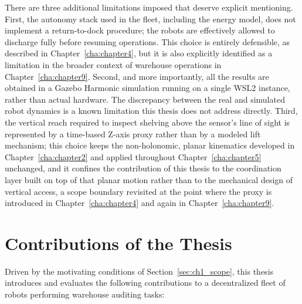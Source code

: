 There are three additional limitations imposed that deserve explicit mentioning. First, the autonomy stack used in the fleet, including the energy model, does not implement a return-to-dock procedure; the robots are effectively allowed to discharge fully before resuming operations. This choice is entirely defensible, as described in Chapter~\ref{cha:chapter4}, but it is also explicitly identified as a limitation in the broader context of warehouse operations in Chapter~\ref{cha:chapter9}. Second, and more importantly, all the results are obtained in a Gazebo Harmonic simulation running on a single WSL2 instance, rather than actual hardware. The discrepancy between the real and simulated robot dynamics is a known limitation this thesis does not address directly. Third, the vertical reach required to inspect shelving above the sensor's line of sight is represented by a time-based Z-axis proxy rather than by a modeled lift mechanism; this choice keeps the non-holonomic, planar kinematics developed in Chapter~\ref{cha:chapter2} and applied throughout Chapter~\ref{cha:chapter5} unchanged, and it confines the contribution of this thesis to the coordination layer built on top of that planar motion rather than to the mechanical design of vertical access, a scope boundary revisited at the point where the proxy is introduced in Chapter~\ref{cha:chapter4} and again in Chapter~\ref{cha:chapter9}.

\section{Contributions of the Thesis\label{sec:ch1_contributions}}

Driven by the motivating conditions of Section~\ref{sec:ch1_scope}, this thesis introduces and evaluates the following contributions to a decentralized fleet of robots performing warehouse auditing tasks:

